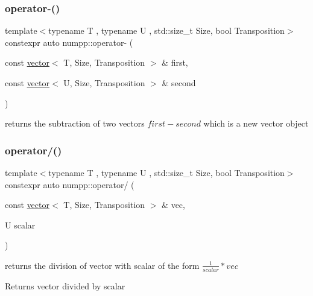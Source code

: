 \subsubsection{\texorpdfstring{operator-\/()}{operator-()}}
{\footnotesize\ttfamily template$<$typename T , typename U , std\+::size\+\_\+t Size, bool Transposition$>$ \\
constexpr auto numpp\+::operator-\/ (\begin{DoxyParamCaption}\item[{const \hyperlink{classnumpp_1_1vector}{vector}$<$ T, Size, Transposition $>$ \&}]{first,  }\item[{const \hyperlink{classnumpp_1_1vector}{vector}$<$ U, Size, Transposition $>$ \&}]{second }\end{DoxyParamCaption})}

returns the subtraction of two vectors $first-second$ which is a new vector object\mbox{\label{group__numpp__structures__vector_ga5089883ef7a3d2a243647cb2cc543735}} 
\subsubsection{\texorpdfstring{operator/()}{operator/()}}
{\footnotesize\ttfamily template$<$typename T , typename U , std\+::size\+\_\+t Size, bool Transposition$>$ \\
constexpr auto numpp\+::operator/ (\begin{DoxyParamCaption}\item[{const \hyperlink{classnumpp_1_1vector}{vector}$<$ T, Size, Transposition $>$ \&}]{vec,  }\item[{U}]{scalar }\end{DoxyParamCaption})}

returns the division of vector with scalar of the form $\frac{1}{scalar}*vec $ \begin{DoxyReturn}{Returns}
vector divided by scalar
\end{DoxyReturn}
\mbox{\label{group__numpp__structures__vector_ga14b45cfacf9d631e87eb16702849698b}} 
